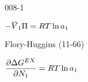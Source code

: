 \begin{mitframe}{008-1}
\begin{listone}
\begin{listtwo}
\begin{listthree}
			\begin{listfour}
            
				\item $-\overline{\vol}_1\osmpress = \gasconst\Temp\ln\activityi{1}$

        
				\begin{listfive}
                
					\item Flory-Huggins (11-66)
					\item $\dfrac{\partial\iipf\gibbs^{\exfunc}}{\partial\molesi{1}} = \gasconst\Temp\ln\activityi{1}$
                    
                    
				\end{listfive}
                
			\end{listfour}
            
		\end{listthree}
        
	\end{listtwo}
    
\end{listone}

\end{mitframe}
